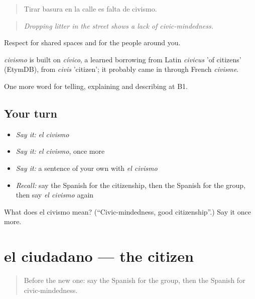 \begin{quote}
Tirar basura en la calle es falta de civismo.
\end{quote}

\begin{quote}
\emph{Dropping litter in the street shows a lack of civic-mindedness.}
\end{quote}

Respect for shared spaces and for the people around you.

\begin{cousinweb}
\emph{civismo} is built on \emph{cívico}, a learned borrowing from Latin \emph{civicus} 'of citizens' (EtymDB), from \emph{civis} 'citizen'; it probably came in through French \emph{civisme}.
\end{cousinweb}

\begin{grammarlens}[title={What you've built}]
One more word for telling, explaining and describing at B1.
\end{grammarlens}

\subsection*{Your turn}
\begin{itemize}
\raggedright
  \item \emph{Say it:} \emph{el civismo}
  \item \emph{Say it:} \emph{el civismo}, once more
  \item \emph{Say it:} a sentence of your own with \emph{el civismo}
  \item \emph{Recall:} say the Spanish for the citizenship, then the Spanish for the group, then say \emph{el civismo} again
\end{itemize}

\begin{tcolorbox}[breakable,colback=teal!4,colframe=teal!35!black,title={Before you move on}]
What does el civismo mean? (\textquotedblleft{}Civic-mindedness, good citizenship\textquotedblright{}.) Say it once more.
\end{tcolorbox}
\section[el ciudadano]{el ciudadano — the citizen}

\label{lesson:ES-C600-ciudadano}



\begin{quote}
Before the new one: say the Spanish for the group, then the Spanish for civic-mindedness.
\end{quote}


